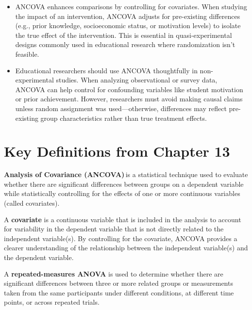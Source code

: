 \documentclass[
  letterpaper,
  DIV=11,
  numbers=noendperiod]{scrreprt}
\begin{document}
\begin{itemize}
  the sphericity assumption may arise when students' score variances
  increase over the years (e.g., early semester scores are relatively
  stable, but later semesters show more fluctuation) or when the
  variance of score differences between Semester 1 and Semester 2 is
  significantly smaller than that between Semester 3 and Semester 4.
\item
  ANCOVA enhances comparisons by controlling for covariates. When
  studying the impact of an intervention, ANCOVA adjusts for
  pre-existing differences (e.g., prior knowledge, socioeconomic status,
  or motivation levels) to isolate the true effect of the intervention.
  This is essential in quasi-experimental designs commonly used in
  educational research where randomization isn't feasible.
\item
  Educational researchers should use ANCOVA thoughtfully in
  non-experimental studies. When analyzing observational or survey data,
  ANCOVA can help control for confounding variables like student
  motivation or prior achievement. However, researchers must avoid
  making causal claims unless random assignment was used---otherwise,
  differences may reflect pre-existing group characteristics rather than
  true treatment effects.
\end{itemize}

\section*{Key Definitions from Chapter
13}\label{key-definitions-from-chapter-13}


\textbf{Analysis of Covariance (ANCOVA)}\,is a statistical technique
used to evaluate whether there are significant differences between
groups on a dependent variable while statistically controlling for the
effects of one or more continuous variables (called covariates).

A \textbf{covariate} is a continuous variable that is included in the
analysis to account for variability in the dependent variable that is
not directly related to the independent variable(s). By controlling for
the covariate, ANCOVA provides a clearer understanding of the
relationship between the independent variable(s) and the dependent
variable.

A \textbf{repeated-measures ANOVA} is used to determine whether there
are significant differences between three or more related groups or
measurements taken from the same participants under different
conditions, at different time points, or across repeated trials.
\end{document}
